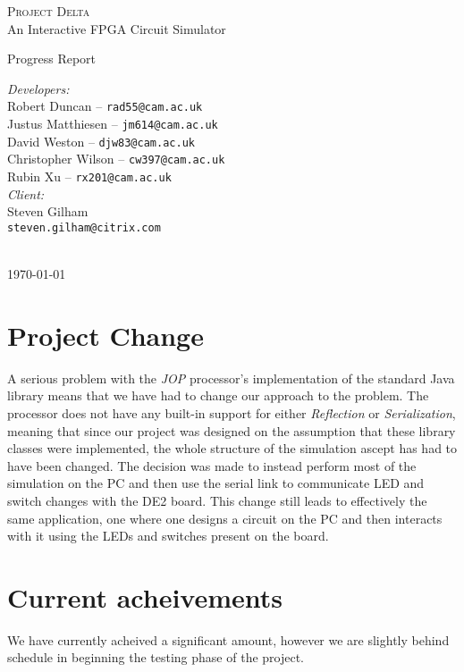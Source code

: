 \documentclass[12pt, a4paper, oneside,titlepage]{article}
\begin{document}
 \begin{titlepage}
 \begin{center}
 \textsc{\huge{Project Delta}} \\
 {\Large{An Interactive FPGA Circuit Simulator}}
\end{center}
\vspace{10em}
 \begin{center}
{\huge{Progress Report}}
\end{center}
\vfill
\setlength{\columnsep}{10em}
\begin{multicols}{2}{
\emph{Developers:}\\
Robert Duncan -- \texttt{rad55@cam.ac.uk} \\
Justus Matthiesen -- \texttt{jm614@cam.ac.uk}\\
David Weston -- \texttt{djw83@cam.ac.uk}\\
Christopher Wilson -- \texttt{cw397@cam.ac.uk}\\
Rubin Xu -- \texttt{rx201@cam.ac.uk}\\
\emph{Client:}\\
Steven Gilham\\
\texttt{steven.gilham@citrix.com}
\\
\\
}
\end{multicols}
\begin{center}
\today
\end{center}
 \end{titlepage}

\tableofcontents
\newpage
\setlength{\parskip}{\medskipamount}
\section{Project Change}
A serious problem with the \emph{JOP} processor's implementation of the standard Java library means that we have had to change our approach to the problem.
The processor does not have any built-in support for either \emph{Reflection} or \emph{Serialization}, meaning that since our project was designed on the assumption that 
these library classes were implemented, the whole structure of the simulation ascept has had to have been changed. The decision was made to instead perform
most of the simulation on the PC and then use the serial link to communicate LED and switch changes with the DE2 board. This change still leads to effectively
the same application, one where one designs a circuit on the PC and then interacts with it using the LEDs and switches present on the board. 
\section{Current acheivements}
We have currently acheived a significant amount, however we are slightly behind schedule in beginning the testing phase of the project. 
\end{document}
